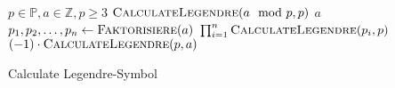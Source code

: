 \documentclass{article}
\newcommand{\tikzmark}[1]{\tikz[overlay,remember picture] \node (#1) {};}
\newcommand*{\AddNote}[4]{%
    \begin{tikzpicture}[overlay, remember picture]
        \draw [decoration={brace,amplitude=0.5em},decorate,very thick]
            ($(#3)!(#1.north)!($(#3)-(0,1)$)$) --  
            ($(#3)!(#2.south)!($(#3)-(0,1)$)$)
                node [align=center, text width=2.5cm, pos=0.5, anchor=west] {#4};
    \end{tikzpicture}
}%
\begin{document}
\begin{preview}
    \begin{algorithm}[H]
        \begin{algorithmic}
            \Require $p \in \mathbb{P}, a \in \mathbb{Z}, p \geq 3$
				\State \Return $\Call{CalculateLegendre}{a \mod p, p}$ 
				\State \Return $a$ 
			 
					\State {}
				\Else
					\State {}
				\EndIf	{}
			 
					\State {}
				\Else
					\State {}
				\EndIf {}
			 
				\State $p_1, p_2, \dots, p_n \gets \Call{Faktorisiere}{a}$
				\State \Return $\prod_{i=1}^n \Call{CalculateLegendre}{p_i, p}$ 
			\Else
				\State \Return $(-1) \cdot \Call{CalculateLegendre}{p, a}$
			\EndIf
        \end{algorithmic}
    \caption{Calculate Legendre-Symbol}
    \label{alg:euclidBaseTransformation}
    \end{algorithm}
\end{preview}
\end{document}

